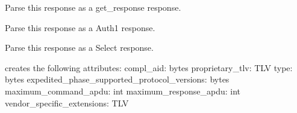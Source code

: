 \documentclass[letterpaper,10pt,english]{sphinxmanual}
\begin{document}
\begin{fulllineitems}

\begin{fulllineitems}
\label{\detokenize{aliro_actuator.access_protocol.apdu:aliro_actuator.access_protocol.apdu.Response.parse_as_get_response}}
\pysigstartsignatures
{}
\pysigstopsignatures
\sphinxAtStartPar
Parse this response as a get\_response response.

\end{fulllineitems}


\begin{fulllineitems}
\label{\detokenize{aliro_actuator.access_protocol.apdu:aliro_actuator.access_protocol.apdu.Response.parse_as_load_cert}}
\pysigstartsignatures
{}
\pysigstopsignatures
\sphinxAtStartPar
Parse this response as a Auth1 response.

\end{fulllineitems}


\begin{fulllineitems}
\label{\detokenize{aliro_actuator.access_protocol.apdu:aliro_actuator.access_protocol.apdu.Response.parse_as_select}}
\pysigstartsignatures
{}
\pysigstopsignatures
\sphinxAtStartPar
Parse this response as a Select response.

\sphinxAtStartPar
creates the following attributes:
compl\_aid: bytes
proprietary\_tlv: TLV
type: bytes
expedited\_phase\_supported\_protocol\_versions: bytes
maximum\_command\_apdu: int
maximum\_response\_apdu: int
vendor\_specific\_extensions: TLV

\end{fulllineitems}


\end{fulllineitems}
\end{document}
